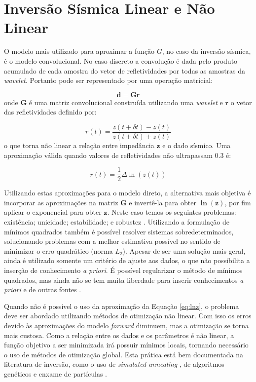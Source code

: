\section{Inversão Sísmica Linear e Não Linear}

O modelo mais utilizado para aproximar a função $G$, no caso da inversão
sísmica, é o modelo convolucional. No caso discreto a convolução é dada pelo
produto acumulado de cada amostra do vetor de refletividades por todas as
amostras da \textit{wavelet}. Portanto pode ser representado por uma operação
matricial:

\begin{equation}
\label{eq:sismDiscreta}
\mathbf{d = Gr}
\end{equation}
onde $\mathbf{G}$ é uma matriz convolucional construída utilizando uma
\textit{wavelet} e $\mathbf r$ o vetor das refletividades definido por:

\begin{equation}
\label{eq:refletDiscreta}
r(t)=\frac{z(t+\delta t) - z(t)}{z(t+\delta t) + z(t)}
\end{equation}
o que torna não linear a relação entre impedância $\mathbf z$ e o dado sísmico.
Uma aproximação válida quando valores de refletividades não ultrapassam $0.3$ é:


\begin{equation}
r(t) = \frac{1}{2}\Delta \ln(z(t))
\label{eq:lnz}
\end{equation}


Utilizando estas aproximações para o modelo direto, a alternativa mais objetiva
é incorporar as aproximações na matriz $\mathbf{G}$ e invertê-la para obter
$\mathbf{\ln(z)}$, por fim aplicar o exponencial para obter $\mathbf{z}$.
Neste caso temos os seguintes problemas: existência; unicidade; estabilidade; e
robustez \citep[p. 56-57]{sen_livro}. Utilizando a formulação de mínimos
quadrados também é possível resolver sistemas sobredeterminados, solucionando
problemas com a melhor estimativa possível no sentido de minimizar o erro
quadrático (norma $L_2$). Apesar de ser uma solução mais geral, ainda é
utilizado somente um critério de ajuste aos dados, o que não possibilita a
inserção de conhecimento \textit{a priori}. É possível regularizar o método de
mínimos quadrados, mas ainda não se tem muita liberdade para inserir
conhecimentos \textit{a priori} e de outras fontes \citep{clappRegLeast3D}.


Quando não é possível o uso da aproximação da Equação \ref{eq:lnz}, o problema
deve ser abordado utilizando métodos de otimização não linear. Com isso os erros
devido às aproximações do modelo \textit{forward} diminuem, mas a otimização se
torna mais custosa. Como a relação entre os dados e os parâmetros é não linear, a
função objetivo a ser minimizada irá possuir mínimos locais, tornando necessário
o uso de métodos de otimização global. Esta prática está bem documentada na
literatura de inversão, como o uso de \textit{simulated annealing}
\citep{max_inv_simulated}, de algoritmos genéticos \citep{MallickGeneticInve} e
enxame de partículas \citep{zhe_nonlinear}. 


